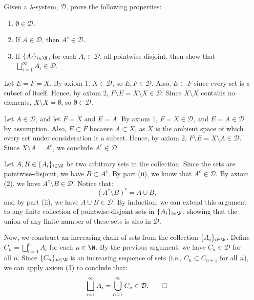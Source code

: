 
\begin{problem}[1]
  Given a $\lambda$-system, $\mathcal{D}$, prove the following properties:
  \begin{enumerate}
    \item $\emptyset \in \mathcal{D}$.
    \item If $A \in \mathcal{D}$, then $A^c \in \mathcal{D}$.
    \item If $\{A_i\}_{i\in\N}$, for each $A_i \in \mathcal{D}$, all pointwise-disjoint, then show that $\bigsqcup_{i=1}^\infty A_i \in \mathcal{D}$.
  \end{enumerate}
\end{problem}

\begin{solution}[(i)]
  Let $E = F = X$. By axiom 1, $X \in \mathcal{D}$, so $E, F \in \mathcal{D}$. Also, $E \subset F$ since every set is a subset of itself. Hence, by axiom 2, $F \setminus E = X \setminus X \in \mathcal{D}$. Since $X \setminus X$ contains no elements, $X \setminus X = \emptyset$, so $\emptyset \in \mathcal{D}$.
\end{solution}

\begin{solution}[(ii)]
  Let $A \in \mathcal{D}$, and let $F = X$ and $E = A$. By axiom 1, $F = X \in \mathcal{D}$, and $E = A \in \mathcal{D}$ by assumption. Also, $E \subset F$ because $A \subset X$, as $X$ is the ambient space of which every set under consideration is a subset. Hence, by axiom 2, $F \setminus E = X \setminus A \in \mathcal{D}$. Since $X \setminus A = A^c$, we conclude $A^c \in \mathcal{D}$.
\end{solution}

\begin{solution}[(iii)]
  Let $A, B \in \{A_i\}_{i\in\N}$ be two arbitrary sets in the collection. Since the sets are pointwise-disjoint, we have $B \subset A^c$. By part (ii), we know that $A^c \in \mathcal{D}$. By axiom (2), we have $A^c \setminus B \in \mathcal{D}$. Notice that:
  \[%
    (A^c \setminus B)^c = A \cup B
  ,\]%
  and by part (ii), we have $A \cup B \in \mathcal{D}$. By induction, we can extend this argument to any finite collection of pointwise-disjoint sets in $\{A_i\}_{i\in\N}$, showing that the union of any finite number of these sets is also in $\mathcal{D}$.

  Now, we construct an increasing chain of sets from the collection $\{A_i\}_{i\in\N}$. Define $C_n = \bigsqcup_{i=1}^n A_i$ for each $n \in \N$. By the previous argument, we have $C_n \in \mathcal{D}$ for all $n$. Since $\{C_n\}_{n\in\N}$ is an increasing sequence of sets (i.e., $C_n \subset C_{n+1}$ for all $n$), we can apply axiom (3) to conclude that:
  \[%
    \bigsqcup_{i=1}^\infty A_i = \bigcup_{n=1}^\infty C_n \in \mathcal{D}
  .\qedhere\]%
\end{solution}
